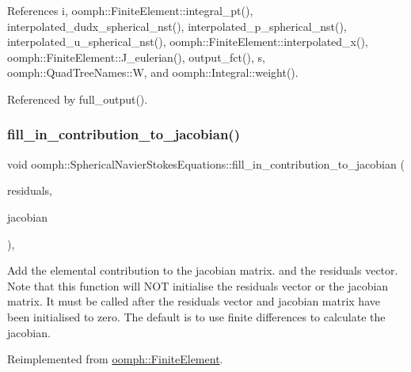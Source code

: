 References i, oomph\+::\+Finite\+Element\+::integral\+\_\+pt(), interpolated\+\_\+dudx\+\_\+spherical\+\_\+nst(), interpolated\+\_\+p\+\_\+spherical\+\_\+nst(), interpolated\+\_\+u\+\_\+spherical\+\_\+nst(), oomph\+::\+Finite\+Element\+::interpolated\+\_\+x(), oomph\+::\+Finite\+Element\+::\+J\+\_\+eulerian(), output\+\_\+fct(), s, oomph\+::\+Quad\+Tree\+Names\+::W, and oomph\+::\+Integral\+::weight().



Referenced by full\+\_\+output().

\mbox{\label{classoomph_1_1SphericalNavierStokesEquations_a518de36d4b06dcd38ab7e18a89f40e9f}} 
\subsubsection{\texorpdfstring{fill\+\_\+in\+\_\+contribution\+\_\+to\+\_\+jacobian()}{fill\_in\_contribution\_to\_jacobian()}}
{\footnotesize\ttfamily void oomph\+::\+Spherical\+Navier\+Stokes\+Equations\+::fill\+\_\+in\+\_\+contribution\+\_\+to\+\_\+jacobian (\begin{DoxyParamCaption}\item[{\hyperlink{classoomph_1_1Vector}{Vector}$<$ double $>$ \&}]{residuals,  }\item[{\hyperlink{classoomph_1_1DenseMatrix}{Dense\+Matrix}$<$ double $>$ \&}]{jacobian }\end{DoxyParamCaption})\hspace{0.3cm}{\ttfamily [inline]}, {\ttfamily [virtual]}}



Add the elemental contribution to the jacobian matrix. and the residuals vector. Note that this function will N\+OT initialise the residuals vector or the jacobian matrix. It must be called after the residuals vector and jacobian matrix have been initialised to zero. The default is to use finite differences to calculate the jacobian. 



Reimplemented from \hyperlink{classoomph_1_1FiniteElement_a0ae7af222af38a0d53bf283dc85bdfea}{oomph\+::\+Finite\+Element}.



